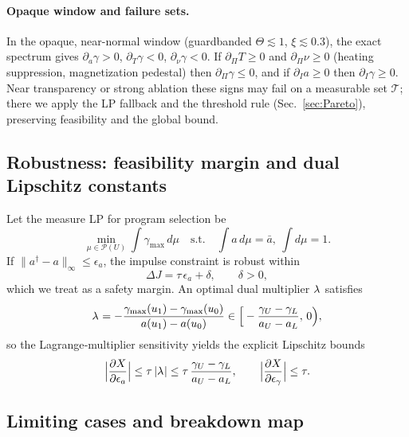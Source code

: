 \documentclass[aps,pre,twocolumn,showpacs,superscriptaddress]{revtex4-2}
\theoremstyle{definition}
\begin{document}
\paragraph*{Opaque window and failure sets.}
In the opaque, near-normal window (guardbanded $\Theta\lesssim 1$, $\xi\lesssim 0.3$), the exact spectrum gives
$\partial_a\gamma>0$, $\partial_T\gamma<0$, $\partial_\nu\gamma<0$. If $\partial_\Pi T\ge 0$ and $\partial_\Pi\nu\ge 0$
(heating suppression, magnetization pedestal) then $\partial_\Pi\gamma\le 0$, and if $\partial_I a\ge 0$ then
$\partial_I\gamma\ge 0$. Near transparency or strong ablation these signs may fail on a measurable set $\mathcal{T}$;
there we apply the LP fallback and the threshold rule (Sec.~\ref{sec:Pareto}), preserving feasibility and the global bound.

\subsection{Robustness: feasibility margin and dual Lipschitz constants}\label{subsec:robustness}

Let the measure LP for program selection be
\begin{equation}\label{eq:LP}
\min_{\mu\in\mathcal{P}(U)} \int \gamma_{\max}\,d\mu\quad \text{s.t.}\quad \int a\,d\mu=\bar a,\ \int d\mu=1.
\end{equation}
If $\|a^\dagger-a\|_\infty\le \epsilon_a$, the impulse constraint is robust within
\begin{equation}\label{eq:DeltaJ}
\Delta J=\tau\,\epsilon_a+\delta,\qquad \delta>0,
\end{equation}
which we treat as a safety margin. An optimal dual multiplier $\lambda^{\*}$ satisfies
\begin{equation}\label{eq:lambda}
\lambda^{\*}=-\frac{\gamma_{\max}(u_1)-\gamma_{\max}(u_0)}{a(u_1)-a(u_0)}\in\Big[-\frac{\gamma_U-\gamma_L}{a_U-a_L},\,0\Big),
\end{equation}
so the Lagrange‑multiplier sensitivity yields the explicit Lipschitz bounds
\begin{equation}\label{eq:Lip}
\Big|\frac{\partial X}{\partial \epsilon_a}\Big|\le \tau\,|\lambda^{\*}|\le \tau\,\frac{\gamma_U-\gamma_L}{a_U-a_L},\qquad
\Big|\frac{\partial X}{\partial \epsilon_\gamma}\Big|\le \tau.
\end{equation}

\subsection{Limiting cases and breakdown map}\label{subsec:limits}
\end{document}
